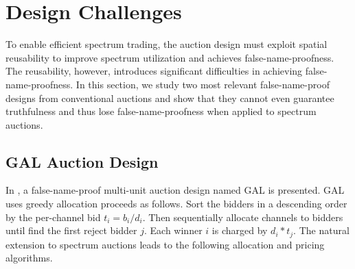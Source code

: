 \documentclass{sig-alternate}
\newtheorem{theorem}{Theorem}
\begin{document}
%
%

\section{Design Challenges}
To enable efficient spectrum trading, the auction design must exploit spatial reusability to improve spectrum utilization and achieves false-name-proofness. The reusability, however, introduces significant difficulties in achieving false-name-proofness.
In this section, we study two most relevant false-name-proof designs \cite{Yokoo:ijcai:01, Terada:03:AAMAS} from conventional auctions and show that they cannot even guarantee truthfulness and thus lose false-name-proofness when applied to spectrum auctions.

\subsection{GAL Auction Design}
In \cite{Terada:03:AAMAS}, a false-name-proof multi-unit auction design named GAL is presented. GAL uses greedy allocation proceeds as follows. Sort the bidders in a descending order by the per-channel bid $t_i=b_i/d_i$. Then sequentially allocate channels to bidders until find the first reject bidder $j$. Each winner $i$ is charged by $d_i*t_j$. The natural extension to spectrum auctions leads to the following allocation and pricing algorithms.
\end{document}
